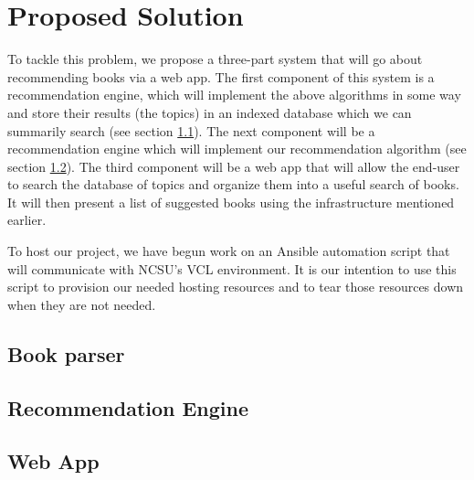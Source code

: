 
\section{Proposed Solution} 
To tackle this problem, we propose a three-part system that will go about recommending books via a web app.  
The first component of this system is a recommendation engine, which will implement the above algorithms in some way and store their results (the topics) in an indexed database which we can summarily search (see section \ref{section:book-parser}).  
The next component will be a recommendation engine which will implement our recommendation algorithm (see section \ref{section:recommendation_engine}).  
The third component will be a web app that will allow the end-user to search the database of topics and organize them into a useful search of books.  
It will then present a list of suggested books using the infrastructure mentioned earlier.

To host our project, we have begun work on an Ansible automation script that will communicate with NCSU's VCL environment.  
It is our intention to use this script to provision our needed hosting resources and to tear those resources down when they are not needed.  

\subsection{Book parser} \label{section:book-parser}


\subsection{Recommendation Engine} \label{section:recommendation_engine}


\subsection{Web App} \label{section:webapp}

